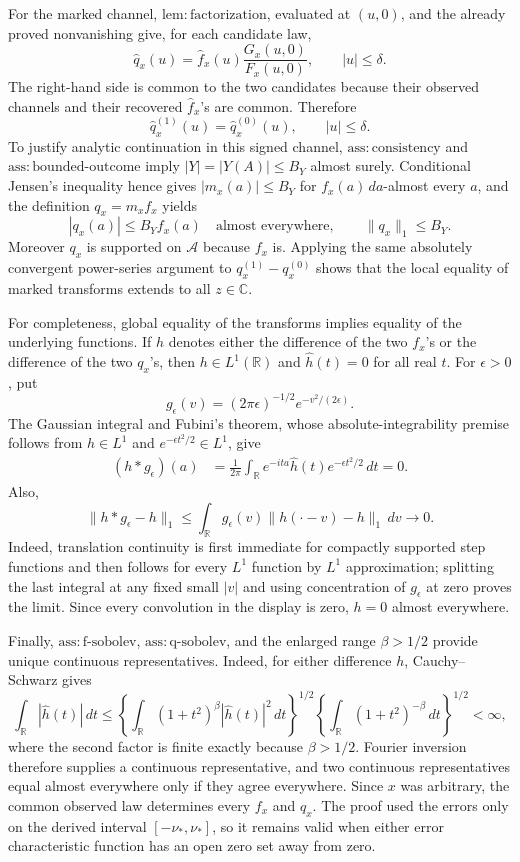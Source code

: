 For the marked channel, \(\mathrm{lem{:}factorization}\), evaluated at \((u,0)\), and the already proved nonvanishing give, for each candidate law,
\[
 \widehat q_x(u)
 =\widehat f_x(u)\frac{G_x(u,0)}{F_x(u,0)},
 \qquad |u|\le\delta.
\]
The right-hand side is common to the two candidates because their observed channels and their recovered \(\widehat f_x\)'s are common. Therefore
\[
 \widehat q_x^{(1)}(u)=\widehat q_x^{(0)}(u),
 \qquad |u|\le\delta.
\]
To justify analytic continuation in this signed channel, \(\mathrm{ass{:}consistency}\) and \(\mathrm{ass{:}bounded\text{-}outcome}\) imply \(|Y|=|Y(A)|\le B_Y\) almost surely. Conditional Jensen's inequality hence gives \(|m_x(a)|\le B_Y\) for \(f_x(a)\,da\)-almost every \(a\), and the definition \(q_x=m_xf_x\) yields
\[
 |q_x(a)|\le B_Yf_x(a)\quad\text{almost everywhere},
 \qquad
 \|q_x\|_1\le B_Y.
\]
Moreover \(q_x\) is supported on \(\mathcal A\) because \(f_x\) is. Applying the same absolutely convergent power-series argument to \(q_x^{(1)}-q_x^{(0)}\) shows that the local equality of marked transforms extends to all \(z\in\mathbb C\).

For completeness, global equality of the transforms implies equality of the underlying functions. If \(h\) denotes either the difference of the two \(f_x\)'s or the difference of the two \(q_x\)'s, then \(h\in L^1(\mathbb R)\) and \(\widehat h(t)=0\) for all real \(t\). For \(\epsilon>0\), put
\[
 g_\epsilon(v)=(2\pi\epsilon)^{-1/2}
 e^{-v^2/(2\epsilon)}.
\]
The Gaussian integral and Fubini's theorem, whose absolute-integrability premise follows from \(h\in L^1\) and \(e^{-\epsilon t^2/2}\in L^1\), give
\[
\begin{aligned}
 (h*g_\epsilon)(a)
 &=\frac{1}{2\pi}\int_{\mathbb R}
 e^{-ita}\widehat h(t)e^{-\epsilon t^2/2}\,dt=0.
\end{aligned}
\]
Also,
\[
 \|h*g_\epsilon-h\|_1
 \le\int_{\mathbb R}g_\epsilon(v)
       \|h(\cdot-v)-h\|_1\,dv\longrightarrow0.
\]
Indeed, translation continuity is first immediate for compactly supported step functions and then follows for every \(L^1\) function by \(L^1\) approximation; splitting the last integral at any fixed small \(|v|\) and using concentration of \(g_\epsilon\) at zero proves the limit. Since every convolution in the display is zero, \(h=0\) almost everywhere.

Finally, \(\mathrm{ass{:}f\text{-}sobolev}\), \(\mathrm{ass{:}q\text{-}sobolev}\), and the enlarged range \(\beta>1/2\) provide unique continuous representatives. Indeed, for either difference \(h\), Cauchy--Schwarz gives
\[
 \int_{\mathbb R}|\widehat h(t)|\,dt
 \le
 \left\{\int_{\mathbb R}(1+t^2)^\beta
                 |\widehat h(t)|^2\,dt\right\}^{1/2}
 \left\{\int_{\mathbb R}(1+t^2)^{-\beta}\,dt\right\}^{1/2}
 <\infty,
\]
where the second factor is finite exactly because \(\beta>1/2\). Fourier inversion therefore supplies a continuous representative, and two continuous representatives equal almost everywhere only if they agree everywhere. Since \(x\) was arbitrary, the common observed law determines every \(f_x\) and \(q_x\). The proof used the errors only on the derived interval \([-\nu_*,\nu_*]\), so it remains valid when either error characteristic function has an open zero set away from zero.
